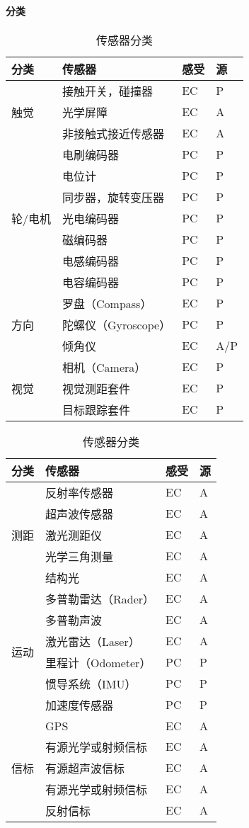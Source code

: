 \documentclass[
12pt, %
a4paper, 
oneside, %
headinclude,footinclude, %
]{scrartcl}
\begin{document}
\paragraph{分类}
\begin{table}[H]
\begin{tabular}{|p{1.5cm}|p{4.2cm}|p{0.9cm}|p{0.8cm}|}
\hline
分类 & 传感器 & 感受 & 源 \\
\hline
\multirow{3}{*}{触觉} & 接触开关，碰撞器 & EC & P \\
 & 光学屏障 & EC & A \\
 & 非接触式接近传感器 & EC & A \\
\hline
\multirow{7}{*}{轮/电机} & 电刷编码器 & PC & P \\
 & 电位计 & PC & P \\
 & 同步器，旋转变压器 & PC & P \\
 & 光电编码器 & PC & P \\
 & 磁编码器 & PC & P \\
 & 电感编码器 & PC & P \\
 & 电容编码器 & PC & P \\
\hline
\multirow{3}{*}{方向} & 罗盘（Compass） & EC & P \\
 & 陀螺仪（Gyroscope） & PC & P \\
 & 倾角仪 & EC & A/P \\
\hline
\multirow{3}{*}{视觉} & 相机（Camera） & EC & P \\
 & 视觉测距套件 & EC & P \\
 & 目标跟踪套件 & EC & P \\
\hline
\end{tabular}
\begin{tabular}{|p{1.5cm}|p{4.2cm}|p{0.9cm}|p{0.8cm}|}
\hline
分类 & 传感器 & 感受 & 源 \\
\hline
\multirow{5}{*}{测距} & 反射率传感器 & EC & A \\
 & 超声波传感器 & EC & A \\
 & 激光测距仪 & EC & A \\
 & 光学三角测量 & EC & A \\
 & 结构光 & EC & A \\
\hline
\multirow{6}{*}{运动} & 多普勒雷达（Rader） & EC & A \\
 & 多普勒声波 & EC & A \\
 & 激光雷达（Laser） & EC & A \\
 & 里程计（Odometer） & PC & P \\
 & 惯导系统（IMU） & PC & P \\
 & 加速度传感器 & PC & P \\
\hline
\multirow{5}{*}{信标} & GPS & EC & A \\
 & 有源光学或射频信标 & EC & A \\
 & 有源超声波信标 & EC & A \\
 & 有源光学或射频信标 & EC & A \\
 & 反射信标 & EC & A \\
\hline
\end{tabular}
\caption{传感器分类}
\end{table}
\end{document}
